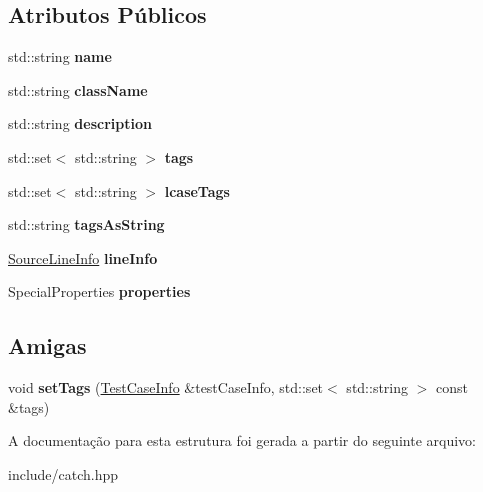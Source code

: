 \subsection*{Atributos Públicos}
\begin{DoxyCompactItemize}
\item 
std\+::string {\bfseries name}\hypertarget{structCatch_1_1TestCaseInfo_a463794e2f5cfead307c93efd134ade36}{}\label{structCatch_1_1TestCaseInfo_a463794e2f5cfead307c93efd134ade36}

\item 
std\+::string {\bfseries class\+Name}\hypertarget{structCatch_1_1TestCaseInfo_a1a5e0825132a38d091defdebbf2f8ce9}{}\label{structCatch_1_1TestCaseInfo_a1a5e0825132a38d091defdebbf2f8ce9}

\item 
std\+::string {\bfseries description}\hypertarget{structCatch_1_1TestCaseInfo_a37fe2db9425bc45f6a33893eac31198e}{}\label{structCatch_1_1TestCaseInfo_a37fe2db9425bc45f6a33893eac31198e}

\item 
std\+::set$<$ std\+::string $>$ {\bfseries tags}\hypertarget{structCatch_1_1TestCaseInfo_a045f62e7719a8760a5b456f7fd2dc97c}{}\label{structCatch_1_1TestCaseInfo_a045f62e7719a8760a5b456f7fd2dc97c}

\item 
std\+::set$<$ std\+::string $>$ {\bfseries lcase\+Tags}\hypertarget{structCatch_1_1TestCaseInfo_a0ed3864a313e8ddc3ae38431be5be9ae}{}\label{structCatch_1_1TestCaseInfo_a0ed3864a313e8ddc3ae38431be5be9ae}

\item 
std\+::string {\bfseries tags\+As\+String}\hypertarget{structCatch_1_1TestCaseInfo_ac65c2d36fd36f71e9bf782b2ea245c64}{}\label{structCatch_1_1TestCaseInfo_ac65c2d36fd36f71e9bf782b2ea245c64}

\item 
\hyperlink{structCatch_1_1SourceLineInfo}{Source\+Line\+Info} {\bfseries line\+Info}\hypertarget{structCatch_1_1TestCaseInfo_aa9407b7f442655b51a2aad24b3fa2fd3}{}\label{structCatch_1_1TestCaseInfo_aa9407b7f442655b51a2aad24b3fa2fd3}

\item 
Special\+Properties {\bfseries properties}\hypertarget{structCatch_1_1TestCaseInfo_afc1e84bd7a2e180895a06d9131302af0}{}\label{structCatch_1_1TestCaseInfo_afc1e84bd7a2e180895a06d9131302af0}

\end{DoxyCompactItemize}
\subsection*{Amigas}
\begin{DoxyCompactItemize}
\item 
void {\bfseries set\+Tags} (\hyperlink{structCatch_1_1TestCaseInfo}{Test\+Case\+Info} \&test\+Case\+Info, std\+::set$<$ std\+::string $>$ const \&tags)\hypertarget{structCatch_1_1TestCaseInfo_addc10c770e56f49da5baa0c76cf25bd5}{}\label{structCatch_1_1TestCaseInfo_addc10c770e56f49da5baa0c76cf25bd5}

\end{DoxyCompactItemize}


A documentação para esta estrutura foi gerada a partir do seguinte arquivo\+:\begin{DoxyCompactItemize}
\item 
include/catch.\+hpp\end{DoxyCompactItemize}
